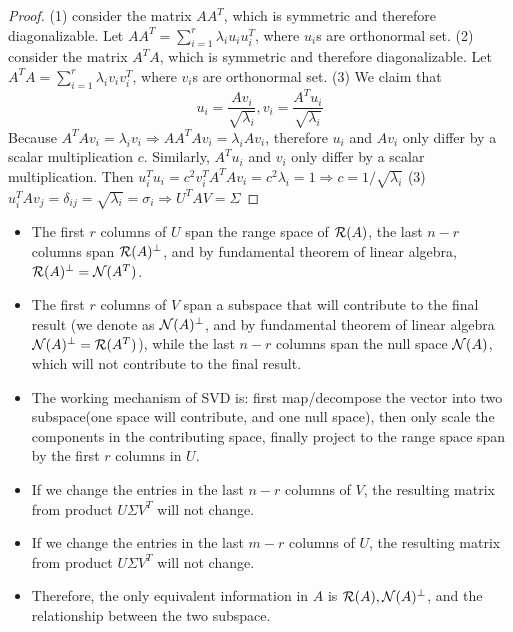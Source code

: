\begin{refsection}
\begin{proof}
(1) consider the matrix $AA^T$, which is symmetric and therefore diagonalizable. Let $AA^T = \sum_{i=1}^r \lambda_i u_iu_i^T$, where $u_i$s are orthonormal set. (2) consider the matrix $A^TA$, which is symmetric and therefore diagonalizable. Let $A^TA = \sum_{i=1}^r \lambda_i v_iv_i^T$, where $v_i$s are orthonormal set. (3) We claim that $$u_i = \frac{Av_i}{\sqrt{\lambda_i}},v_i = \frac{A^Tu_i}{\sqrt{\lambda_i}}$$
Because $A^TAv_i = \lambda_i v_i \Rightarrow AA^TAv_i = \lambda_i Av_i$, therefore $u_i$ and $Av_i$ only differ by a scalar multiplication $c$. Similarly, $A^Tu_i$ and $v_i$ only differ by a scalar multiplication. Then $u_i^T u_i = c^2 v_i^TA^TAv_i = c^2 \lambda_i = 1 \Rightarrow c = 1/\sqrt{\lambda_i}$
(3) $u_i^TAv_j = \delta_{ij} = \sqrt{\lambda_i} = \sigma_i \Rightarrow U^TAV = \Sigma$
\end{proof}


\begin{note}\hfill
\begin{itemize}
    \item The first $r$ columns of $U$ span the range space of $\mathcal{R}(A)$, the last $n-r$ columns span $\mathcal{R}(A)^\perp$, and by fundamental theorem of linear algebra, $\mathcal{R}(A)^\perp = \mathcal{N}(A^T)$.
    \item The first $r$ columns of $V$ span a subspace that will contribute to the final result (we denote as $\mathcal{N}(A)^{\perp}$, and by fundamental theorem of linear algebra $\mathcal{N}(A)^{\perp} = \mathcal{R}(A^T)$), while the last $n-r$ columns span the null space $\mathcal{N}(A)$, which will not contribute to the final result. 
    \item The working mechanism of SVD is: first map/decompose the vector into two subspace(one space will contribute, and one null space), then only scale the components in the contributing space, finally project to the range space span by the first $r$ columns in $U$. 
\end{itemize}
\end{note}

\begin{remark}\hfill
\begin{itemize}
    \item If we change the entries in the last $n-r$ columns of $V$, the resulting matrix from product $U\Sigma V^T$ will not change. 
    \item If we change the entries in the last $m-r$ columns of $U$, the resulting matrix from product $U\Sigma V^T$ will not change. 
    \item Therefore, the only equivalent information in $A$ is $\mathcal{R}(A),\mathcal{N}(A)^\perp$, and the relationship between the two subspace. 
\end{itemize}
\end{remark}


\end{refsection}

